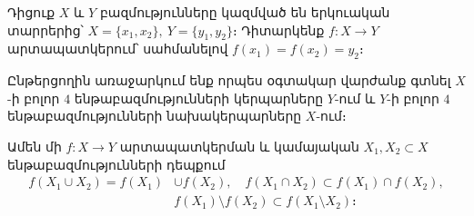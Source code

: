 \documentclass[./main.tex]{subfiles}
\begin{document}




\begin{example}\label{ch1ex7}
\label{օրինակ 1:7}
Դիցուք $X$ և $Y$ բազմությունները կազմված են երկուական տարրերից՝ $X=\{x_1,x_2\},\ Y=\{y_1,y_2\}$։ Դիտարկենք $f:X\to Y$ արտապատկերում՝ սահմանելով $f(x_1)=f(x_2)=y_2$։
\par Ընթերցողին առաջարկում ենք որպես օգտակար վարժանք գտնել $X$-ի բոլոր $4$ ենթաբազմությունների կերպարները $Y$-ում և $Y$-ի բոլոր $4$ ենթաբազմությունների նախակերպարները $X$-ում։
\end{example}
\begin{theorem}\label{ch1thm1} 
Ամեն մի $f:X\rightarrow Y$ արտապատկերման և կամայական $X_1,X_2\subset X$ ենթաբազմությունների դեպքում
\begin{align*}
f(X_1\cup  X_2)=f(X_1)&\cup  f(X_2), \quad f(X_1\cap X_2)\subset {f(X_1)\cap f(X_2)},\\
& {f(X_1)\setminus f(X_2)\subset f(X_1\setminus X_2)}։
\end{align*}
\end{theorem}
\label{թեորեմ 1:1}
\end{document}
